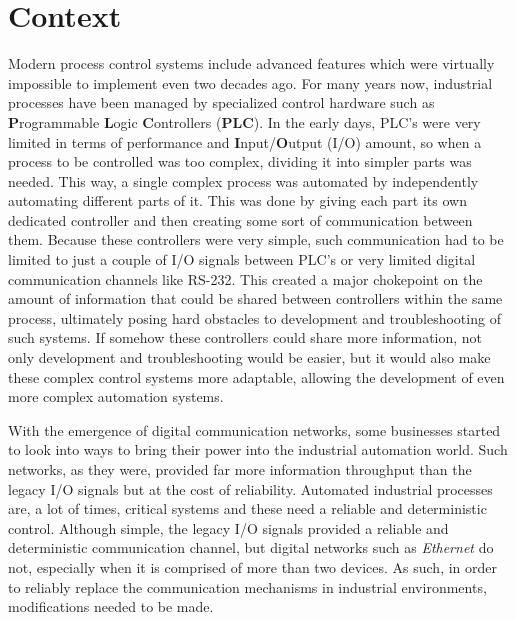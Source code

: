 \section{Context} \label{sec:context}

Modern process control systems include advanced features which were virtually
impossible to implement even two decades ago. For many years now, industrial
processes have been managed by specialized control hardware such as \textbf
Programmable \textbf Logic \textbf Controllers ({\bfseries PLC}). In the early
days, PLC's were very limited in terms of performance and \textbf Input/\textbf
Output (I/O) amount, so when a process to be controlled was too complex,
dividing it into simpler parts was needed. This way, a single complex process
was automated by independently automating different parts of it. This was done
by giving each part its own dedicated controller and then creating some sort of
communication between them. Because these controllers were very simple, such
communication had to be limited to just a couple of I/O signals between PLC's
or very limited digital communication channels like RS-232. This created a
major chokepoint on the amount of information that could be shared between
controllers within the same process, ultimately posing hard obstacles to
development and troubleshooting of such systems. If somehow these controllers
could share more information, not only development and troubleshooting would be
easier, but it would also make these complex control systems more adaptable,
allowing the development of even more complex automation systems.

With the emergence of digital communication networks, some businesses started
to look into ways to bring their power into the industrial automation world.
Such networks, as they were, provided far more information throughput than the
legacy I/O signals but at the cost of reliability. Automated industrial
processes are, a lot of times, critical systems and these need a reliable and
deterministic control. Although simple, the legacy I/O signals provided a
reliable and deterministic communication channel, but digital networks such as
\emph{Ethernet} do not, especially when it is comprised of more than two
devices. As such, in order to reliably replace the communication mechanisms in
industrial environments, modifications needed to be made.


